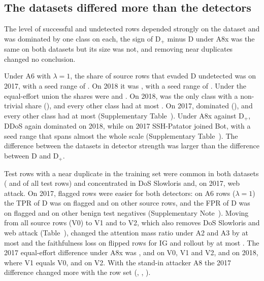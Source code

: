 \subsection*{The datasets differed more than the detectors}
\label{sec:rq3}
The level of successful and undetected rows depended strongly on the dataset and was dominated by one class on each,
the sign of D$_+$ minus D under A8x was the same on both datasets but its size was not, and removing near duplicates
changed no conclusion.

Under A6 with $\lambda = 1$, the share of source rows that evaded D undetected was \undetDAsixOneVoneSeventeen{} on
2017, with a seed range of \undetDAsixOneVoneSeventeenRange.
On 2018 it was \undetDAsixOneVoneEighteen, with a seed range of \undetDAsixOneVoneEighteenRange.
Under the equal-effort union the shares were \axHeadVoneSeventeenD{} and \axHeadVoneEighteenD.
On 2018, \pcTopClassEighteen{} was the only class with a non-trivial share (\pcTopEighteen), and every other class had
at most \pcRestMaxEighteen.
On 2017, \pcTopClassSeventeen{} dominated (\pcTopSeventeen), and every other class had at most \pcRestMaxSeventeen{}
(Supplementary Table~\suppTabPerClassVone).
Under A8x against D$_+$, DDoS again dominated on 2018, while on 2017 SSH-Patator joined Bot, with a seed range that
spans almost the whole scale (Supplementary Table~\suppTabPerClassVone).
The difference between the datasets in detector strength was larger than the difference between D and D$_+$.

Test rows with a near duplicate in the training set were common in both datasets (\ndAllSeventeen{} and
\ndAllEighteen{} of all test rows) and concentrated in DoS Slowloris and, on 2017, web attack.
On 2017, flagged rows were easier for both detectors: on A6 rows ($\lambda = 1$) the TPR of D was \tprDNdSeventeen{} on
flagged and \tprDOtherSeventeen{} on other source rows, and the FPR of D was \fprDNdSeventeen{} on flagged and
\fprDOtherSeventeen{} on other benign test negatives (Supplementary Note~\suppNoteNeardup).
Moving from all source rows (V0) to V1 and to V2, which also removes DoS Slowloris and web attack
(Table~\mainTabNeardup), changed the attention mass ratio under A2 and A3 by at most \sensMaxMassChange{} and the
faithfulness loss on flipped rows for IG and rollout by at most \sensMaxFlipChange.
The 2017 equal-effort difference under A8x was \axHeadVzeroSeventeen{}, \axHeadVoneSeventeen{} and
\axHeadVtwoSeventeen{} on V0, V1 and V2, and on 2018, where V1 equals V0, \axHeadVoneEighteen{} and
\axHeadVtwoEighteen{} on V2.
With the stand-in attacker A8 the 2017 difference changed more with the row set (\axStandinVzeroSeventeen,
\axStandinVoneSeventeen, \axStandinVtwoSeventeen).
